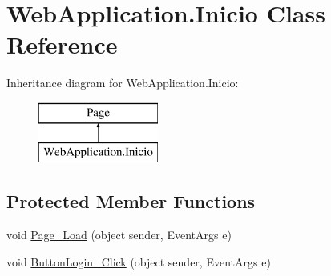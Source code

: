 \hypertarget{classWebApplication_1_1Inicio}{}\section{Web\+Application.\+Inicio Class Reference}
\label{classWebApplication_1_1Inicio}
Inheritance diagram for Web\+Application.\+Inicio\+:\begin{figure}[H]
\begin{center}
\leavevmode
\includegraphics[height=2.000000cm]{d0/d51/classWebApplication_1_1Inicio}
\end{center}
\end{figure}
\subsection*{Protected Member Functions}
\begin{DoxyCompactItemize}
\item 
void \mbox{\hyperlink{classWebApplication_1_1Inicio_a49ed6b3fca4c9a9ab9487df6ac627716}{Page\+\_\+\+Load}} (object sender, Event\+Args e)
\item 
void \mbox{\hyperlink{classWebApplication_1_1Inicio_ae7a3d9491d82443eb3e3841c78221e54}{Button\+Login\+\_\+\+Click}} (object sender, Event\+Args e)
\end{DoxyCompactItemize}
